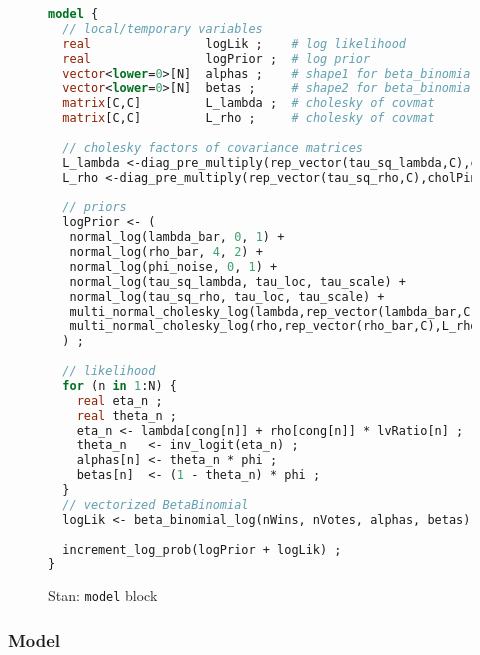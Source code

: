\begin{figure}
\begin{lstlisting}[language=Stan, frame=trBL]
model {
  // local/temporary variables
  real                logLik ;    # log likelihood
  real                logPrior ;  # log prior
  vector<lower=0>[N]  alphas ;    # shape1 for beta_binomial 
  vector<lower=0>[N]  betas ;     # shape2 for beta_binomial
  matrix[C,C]         L_lambda ;  # cholesky of covmat
  matrix[C,C]         L_rho ;     # cholesky of covmat
  
  // cholesky factors of covariance matrices
  L_lambda <-diag_pre_multiply(rep_vector(tau_sq_lambda,C),cholPinverse);
  L_rho <-diag_pre_multiply(rep_vector(tau_sq_rho,C),cholPinverse);
  
  // priors
  logPrior <- (
   normal_log(lambda_bar, 0, 1) + 
   normal_log(rho_bar, 4, 2) + 
   normal_log(phi_noise, 0, 1) +
   normal_log(tau_sq_lambda, tau_loc, tau_scale) +
   normal_log(tau_sq_rho, tau_loc, tau_scale) +
   multi_normal_cholesky_log(lambda,rep_vector(lambda_bar,C),L_lambda) +
   multi_normal_cholesky_log(rho,rep_vector(rho_bar,C),L_rho) 
  ) ;
  
  // likelihood
  for (n in 1:N) {
    real eta_n ;
    real theta_n ;
    eta_n <- lambda[cong[n]] + rho[cong[n]] * lvRatio[n] ;
    theta_n   <- inv_logit(eta_n) ;    
    alphas[n] <- theta_n * phi ;
    betas[n]  <- (1 - theta_n) * phi ;
  }
  // vectorized BetaBinomial
  logLik <- beta_binomial_log(nWins, nVotes, alphas, betas) ; 
  
  increment_log_prob(logPrior + logLik) ; 
}
\end{lstlisting}
\caption{Stan: {\tt model} block}
\label{stan_model}
\end{figure}
%


\subsubsection{Model}

